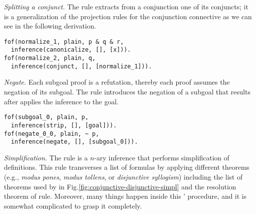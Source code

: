 \documentclass[../main.tex]{subfiles}
\begin{document}

\textit{Splitting a conjunct.} The \conjunct rule extracts from a
conjunction one of its conjuncts; it is a generalization of the
projection rules for the conjunction connective as we can see in the
following \TSTP derivation.

\begin{verbatim}
fof(normalize_1, plain, p & q & r,
  inference(canonicalize, [], [x])).
fof(normalize_2, plain, q,
  inference(conjunct, [], [normalize_1])).
\end{verbatim}

\textit{Negate.}
Each subgoal proof is a refutation, thereby each proof assumes
the negation of its subgoal. The \negate rule
introduces the negation of a subgoal that results
after applies the \strip inference to the goal.

\begin{verbatim}
fof(subgoal_0, plain, p,
  inference(strip, [], [goal])).
fof(negate_0_0, plain, ~ p,
  inference(negate, [], [subgoal_0])).
\end{verbatim}


\textit{Simplification.}
The \simplify rule is a $n$-ary inference that performs
simplification of definitions. This rule transverses a list of
formulas by applying different theorems (e.g., \emph{modus pones},
\emph{modus tollens}, or \emph{disjunctive syllogism}) including the
list of theorems used by \canonicalize in
Fig.\ref{fig:conjunctive-disjunctive-simpl} and the resolution
theorem of \resolve rule. Moreover, many things happen inside this
\Metis' procedure, and it is somewhat complicated to grasp it
completely.
\end{document}
